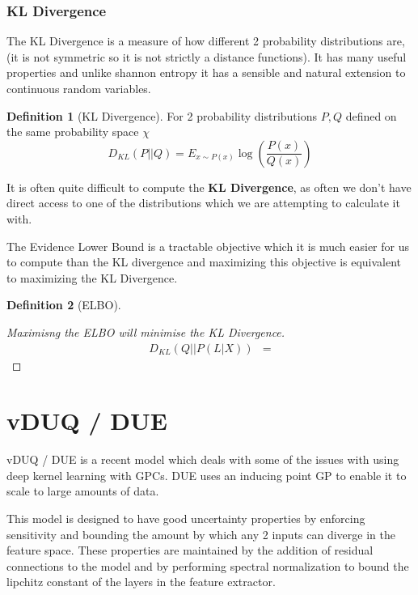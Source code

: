 \documentclass[12pt, a4paper]{report}
\theoremstyle{definition}
\theoremstyle{definition}
\newtheorem{definition}{Definition}[section]
\theoremstyle{definition}
\begin{document}
\subsection{KL Divergence}

The KL Divergence is a measure of how different 2 probability distributions are, (it is not symmetric so it is not strictly a distance functions). It has many useful properties and unlike shannon entropy it has a sensible and natural extension to continuous random variables.

\begin{definition}[KL Divergence]
    For 2 probability distributions $P, Q$ defined on the same probability space $\chi$
    $$D_{KL} \left( P || Q \right) = E_{x \sim P(x)}  \log \left( \frac{P(x)}{Q(x)}\right)$$
\end{definition}



It is often quite difficult to compute the \textbf{KL Divergence}, as often we don't have direct access to one of the distributions which we are attempting to calculate it with.

The Evidence Lower Bound is a tractable objective which it is much easier for us to compute than the KL divergence and maximizing this objective is equivalent to maximizing the KL Divergence.

\begin{definition}[ELBO]
    
\end{definition}


\begin{proof}[Maximisng the ELBO will minimise the KL Divergence]
    \begin{align*}
        D_{KL} \left( Q || P \left(L | X\right) \right) &= 
    \end{align*}
\end{proof}


\chapter{vDUQ / DUE}
\label{sec:DUE}

vDUQ / DUE \cite{vanamersfoort2020uncertainty} is a recent model which deals with some of the issues with using deep kernel learning with GPCs. DUE uses an inducing point GP to enable it to scale to large amounts of data.

This model is designed to have good uncertainty properties by enforcing sensitivity and bounding the amount by which any 2 inputs can diverge in the feature space. These properties are maintained by the addition of residual connections to the model and by performing spectral normalization to bound the lipchitz constant of the layers in the feature extractor.
\end{document}
